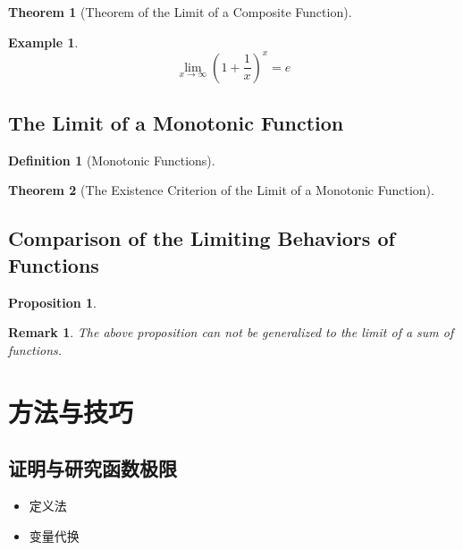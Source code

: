 \documentclass[onecolumn]{ctexart}
\newtheorem{definition}{Definition}
\newtheorem{theorem}{Theorem}
\newtheorem{proposition}{Proposition}
\newtheorem{remark}{Remark}
\newtheorem{example}{Example}
\begin{document}
\begin{theorem}[Theorem of the Limit of a Composite Function]
  
\end{theorem}

\begin{example}
  \begin{equation}
    \lim_{x \to \infty} (1 + \frac{1}{x})^x = e
  \end{equation}
\end{example}

\subsection{The Limit of a Monotonic Function}

\begin{definition}[Monotonic Functions]
  
\end{definition}

\begin{theorem}[The Existence Criterion of the Limit of a Monotonic Function]
  
\end{theorem}

\subsection{Comparison of the Limiting Behaviors of Functions}

\begin{proposition}
  
\end{proposition}

\begin{remark}
  The above proposition can not be generalized to the limit of a sum of 
  functions.
\end{remark}

\section{方法与技巧}

\subsection{证明与研究函数极限}

\begin{itemize}
  \item 定义法
  \item 变量代换
\end{itemize}
\end{document}
